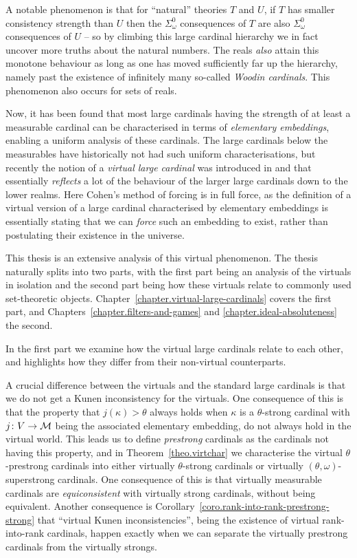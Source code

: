 \documentclass[../main]{subfiles}
\begin{document}
\begin{onehalfspacing}
\quad A notable phenomenon is that for ``natural'' theories $T$ and $U$, if $T$ has smaller consistency strength than $U$ then the $\Sigma^0_\omega$ consequences of $T$ are also $\Sigma^0_\omega$ consequences of $U$ -- so by climbing this large cardinal hierarchy we in fact uncover more truths about the natural numbers. The reals \textit{also} attain this monotone behaviour as long as one has moved sufficiently far up the hierarchy, namely past the existence of infinitely many so-called \textit{Woodin cardinals}. This phenomenon also occurs for sets of reals.

\quad Now, it has been found that most large cardinals having the strength of at least a measurable cardinal can be characterised in terms of \textit{elementary embeddings}, enabling a uniform analysis of these cardinals. The large cardinals below the measurables have historically not had such uniform characterisations, but recently the notion of a \textit{virtual large cardinal} was introduced in \cite{Schindler} and \cite{GitmanSchindler} that essentially \textit{reflects} a lot of the behaviour of the larger large cardinals down to the lower realms. Here Cohen's method of forcing is in full force, as the definition of a virtual version of a large cardinal characterised by elementary embeddings is essentially stating that we can \textit{force} such an embedding to exist, rather than postulating their existence in the universe.

\quad This thesis is an extensive analysis of this virtual phenomenon. The thesis naturally splits into two parts, with the first part being an analysis of the virtuals in isolation and the second part being how these virtuals relate to commonly used set-theoretic objects. Chapter~\ref{chapter.virtual-large-cardinals} covers the first part, and Chapters~\ref{chapter.filters-and-games} and \ref{chapter.ideal-absoluteness} the second. 

\quad In the first part we examine how the virtual large cardinals relate to each other, and highlights how they differ from their non-virtual counterparts. 

\quad A crucial difference between the virtuals and the standard large cardinals is that we do not get a Kunen inconsistency for the virtuals. One consequence of this is that the property that $j(\kappa)>\theta$ always holds when $\kappa$ is a $\theta$-strong cardinal with $j\colon V\to\operatorname{\mathcal M}$ being the associated elementary embedding, do not always hold in the virtual world. This leads us to define \textit{prestrong} cardinals as the cardinals not having this property, and in Theorem~\ref{theo.virtchar} we characterise the virtual $\theta$-prestrong cardinals into either virtually $\theta$-strong cardinals or virtually $(\theta,\omega)$-superstrong cardinals. One consequence of this is that virtually measurable cardinals are \textit{equiconsistent} with virtually strong cardinals, without being equivalent. Another consequence is Corollary~\ref{coro.rank-into-rank-prestrong-strong} that ``virtual Kunen inconsistencies'', being the existence of virtual rank-into-rank cardinals, happen exactly when we can separate the virtually prestrong cardinals from the virtually strongs.


\end{onehalfspacing}
\end{document}
